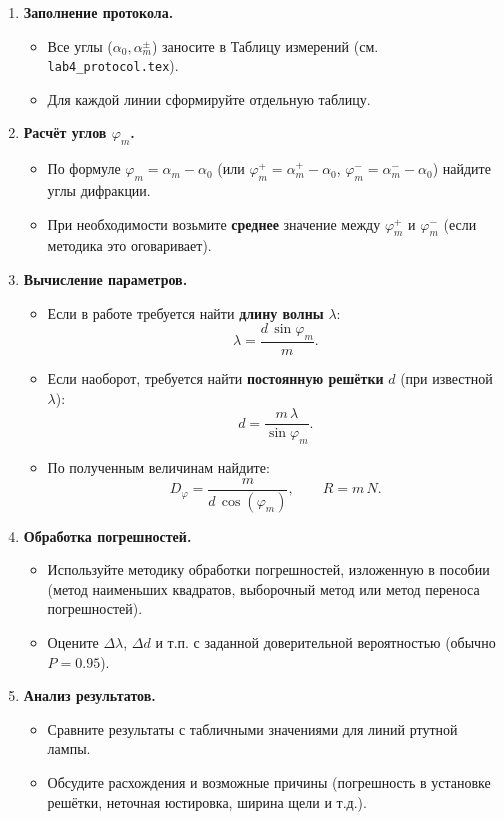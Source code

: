 \documentclass[a4paper,12pt]{article}
\begin{document}
\begin{enumerate}
  \item \textbf{Заполнение протокола.}
  \begin{itemize}
    \item Все углы ($\alpha_0, \alpha_m^\pm$) заносите в Таблицу измерений (см. \texttt{lab4\_protocol.tex}).
    \item Для каждой линии сформируйте отдельную таблицу.
  \end{itemize}
  
  \item \textbf{Расчёт углов $\varphi_m$.}
  \begin{itemize}
    \item По формуле $\varphi_m = \alpha_m - \alpha_0$ (или $\varphi_m^+ = \alpha_m^+ - \alpha_0$, $\varphi_m^- = \alpha_m^- - \alpha_0$) найдите углы дифракции.
    \item При необходимости возьмите \textbf{среднее} значение между $\varphi_m^+$ и $\varphi_m^-$ (если методика это оговаривает).
  \end{itemize}
  
  \item \textbf{Вычисление параметров.}
  \begin{itemize}
    \item Если в работе требуется найти \textbf{длину волны} $\lambda$:
    \[
      \lambda = \frac{d \,\sin \varphi_m}{m}.
    \]
    \item Если наоборот, требуется найти \textbf{постоянную решётки} $d$ (при известной $\lambda$):
    \[
      d = \frac{m\, \lambda}{\sin \varphi_m}.
    \]
    \item По полученным величинам найдите:
      \[
        D_{\varphi} = \frac{m}{d\, \cos(\varphi_m)}, 
        \qquad
        R = m \, N.
      \]
  \end{itemize}
  
  \item \textbf{Обработка погрешностей.}
  \begin{itemize}
    \item Используйте методику обработки погрешностей, изложенную в пособии (метод наименьших квадратов, выборочный метод или метод переноса погрешностей).
    \item Оцените $\Delta \lambda$, $\Delta d$ и т.п. с заданной доверительной вероятностью (обычно $P=0.95$).
  \end{itemize}
  
  \item \textbf{Анализ результатов.}
  \begin{itemize}
    \item Сравните результаты с табличными значениями для линий ртутной лампы.
    \item Обсудите расхождения и возможные причины (погрешность в установке решётки, неточная юстировка, ширина щели и т.д.).
  \end{itemize}
  

\end{enumerate}
\end{document}
